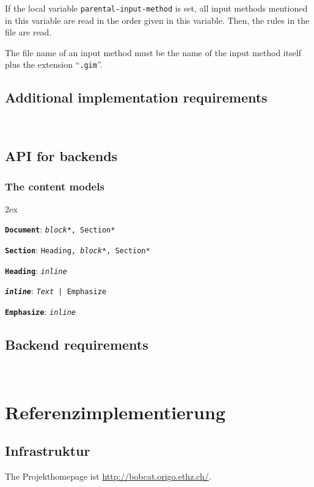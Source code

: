 \documentclass[12pt,openany]{book}
\begin{document}
If the local variable \verb|parental-input-method| is set, all input methods
mentioned in this variable are read in the order given in this variable.  Then,
the rules in the file are read.

The file name of an input method must be the name of the input method itself
plus the extension ``\verb|.gim|''.

\section{Additional implementation requirements}

~

\section{API for backends}

\subsection{The content models}

\begingroup\parindent0pt\parskip2ex
\newcommand{\element}[2]{\texttt{\textbf{#1}}: \texttt{#2}}

\element{Document}{\textit{block}*, Section*}

\element{Section}{Heading, \textit{block}*, Section*}

\element{Heading}{\textit{inline}}

\element{\textit{inline}}{\textit{Text} | Emphasize}

\element{Emphasize}{\textit{inline}}

\endgroup

\section{Backend requirements}

~


\chapter{Referenzimplementierung}

\section{Infrastruktur}

The Projekthomepage ist \url{http://bobcat.origo.ethz.ch/}.
\end{document}
